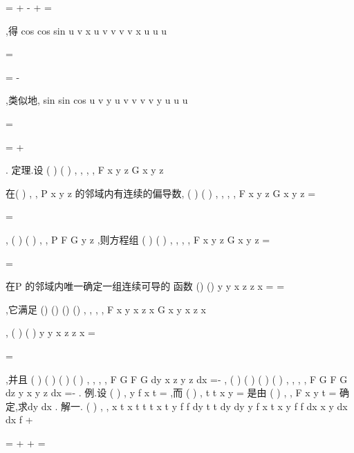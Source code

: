 \partial 
\partial 
\partial 





\Rightarrow 


\partial 
\partial 
\partial 






=
+
\cdots 
-
+
\cdots 
=






\partial 
\partial 
\partial 






,得 
cos
cos
sin
u
v
x
u
v
v
v
v
x
u
u
u
\partial 

=
\partial 
\partial 

=
-
\partial 

,类似地,
sin
sin
cos
u
v
y
u
v
v
v
v
y
u
u
u
\partial 

=
\partial 
\partial 

=
+
\partial 

. 
\textcolor{lyred}{定理}.设
(
)
(
)
, ,
, ,
F x y z
G x y z

在(
)
,
,
P x
y z
的邻域内有连续的偏导数,
(
)
(
)
,
,
,
,
F x
y
z
G x
y
z
=

=

, 
(
)
(
)
,
,
P
F G
y z
\partial 
\neq 
\partial 
,则方程组
(
)
(
)
, ,
, ,
F x y z
G x y z
=

=

在P 的邻域内唯一确定一组连续可导的 
函数
()
()
y
y x
z
z x
=
=

,它满足
()
()
()
()
,
,
,
,
F x y x
z x
G x y x
z x

\equiv 






\equiv 






,
(
)
(
)
y
y x
z
z x
=

=

,并且 
(
)
(
)
(
)
(
)
,
,
,
,
F G
F G
dy
x z
y z
dx
\partial 
\partial 
=-\partial 
\partial 
,
(
)
(
)
(
)
(
)
,
,
,
,
F G
F G
dz
y x
y z
dx
\partial 
\partial 
=-\partial 
\partial 
. 
\textcolor{lyred}{例}.设
(
)
,
y
f x t
=
,而
(
)
,
t
t x y
=
是由
(
)
, ,
F x y t =
确定,求dy
dx . 
解一.
(
)
,
,
x
t
x
t
t
t
x
t
y
f
f
dy
t
t dy
dy
y
f
x t x y
f
f
dx
x
y dx
dx
f
\partial 
\partial 
\partial 
\partial 
+


\partial 
\partial 
\equiv 
\Rightarrow 
=
+
+
\Rightarrow 
=






